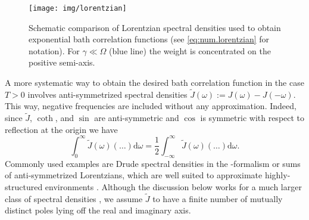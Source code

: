 \begin{figure}
  \centering
  \texttt{[image: img/lorentzian]}
  \caption{%
    Schematic comparison of Lorentzian spectral densities used to obtain exponential bath correlation functions (see \autoref{eq:num.lorentzian} for notation).
    For $\gamma\ll\Omega$ (blue line) the weight is concentrated on the positive semi-axis.
  }
  \label{fig:num.lorentzian}
\end{figure}

A more systematic way to obtain the desired bath correlation function in the case $T > 0$ involves anti-symmetrized spectral densities $\tilde J(\omega) := J(\omega) - J(-\omega)$.
This way, negative frequencies are included without any approximation.
Indeed, since $\tilde J$, $\coth$, and $\sin$ are anti-symmetric and $\cos$ is symmetric with respect to reflection at the origin we have
\begin{equation}
  \int_0^\infty \tilde J(\omega) (\dots) \mathrm{d}\omega = \frac{1}{2}\int_{-\infty}^\infty \tilde J(\omega) (\dots) \mathrm{d}\omega.
  \label{eq:num.correlation_integral}
\end{equation}
Commonly used examples are Drude spectral densities in the \HEOM-formalism or sums of anti-symmetrized Lorentzians, which are well suited to approximate highly-structured environments \cite{MeTa99_non_markovian}.
Although the discussion below works for a much larger class of spectral densities \cite{RiEi13_bcf}, we assume $\tilde J$ to have a finite number of mutually distinct poles lying off the real and imaginary axis.

